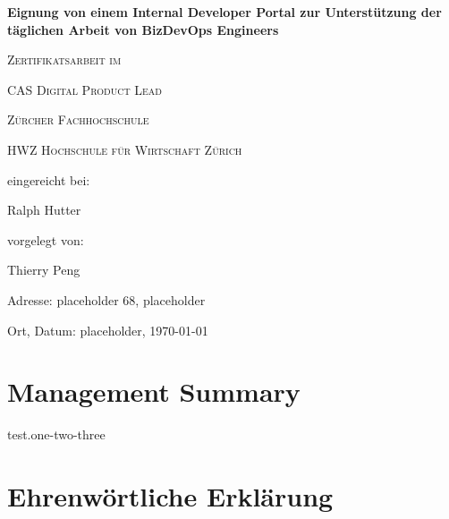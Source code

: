 \documentclass[a4paper,12pt]{article}
\begin{document}
    \begin{titlepage}
        \begin{center}
        {\huge\bfseries Eignung von einem Internal Developer Portal zur Unterstützung der täglichen Arbeit von BizDevOps Engineers\par}
            \vspace{2cm}

            {\scshape\large Zertifikatsarbeit im \par}
            {\scshape\large CAS Digital Product Lead \par}
            \vspace{1cm}

            {\scshape\large Zürcher Fachhochschule \par}
            {\scshape\large HWZ Hochschule für Wirtschaft Zürich \par}
            \vspace{4cm}

            {\normalsize eingereicht bei:\par}
            \vspace{0.5cm}

            {\large Ralph Hutter\par}
            \vfill
            {\normalsize vorgelegt von:\par}
            \vspace{0.5cm}
            {\large Thierry Peng\par}
            \vspace{0.5cm}
            {\normalsize Adresse: placeholder 68, placeholder\par}
            {\normalsize  Ort, Datum: placeholder, \today\par}

        \end{center}
    \end{titlepage}


    \section*{Management Summary}

    test.one-two-three
    \parencite{backstageio}
    \pagebreak


    \tableofcontents
    \pagebreak


    \section*{Ehrenwörtliche Erklärung}
\end{document}
